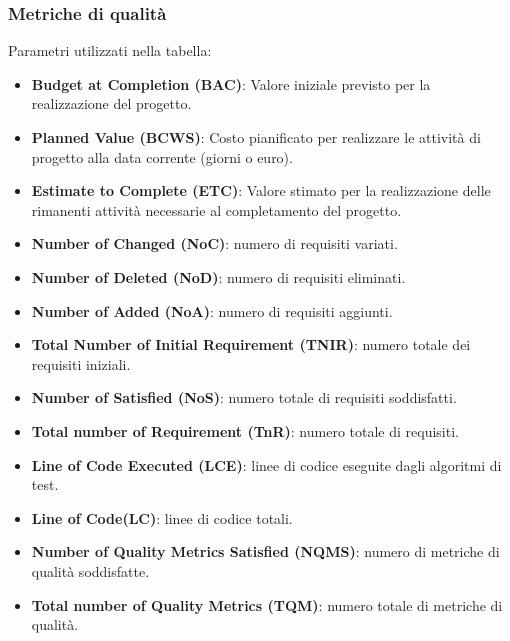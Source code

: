 \subsubsection{Metriche di qualità}
Parametri utilizzati nella tabella:
\begin{itemize}
    \item \textbf{Budget at Completion (BAC)}: Valore iniziale previsto per la realizzazione del progetto.
    \item \textbf{Planned Value (BCWS)}: Costo pianificato per realizzare le attività di progetto alla data corrente (giorni o euro).
    \item \textbf{Estimate to Complete (ETC)}: Valore stimato per la realizzazione delle rimanenti attività necessarie al completamento del progetto.
    \item \textbf{Number of Changed (NoC)}: numero di requisiti variati.
    \item \textbf{Number of Deleted (NoD)}: numero di requisiti eliminati.
    \item \textbf{Number of Added (NoA)}: numero di requisiti aggiunti.
    \item \textbf{Total Number of Initial Requirement (TNIR)}: numero totale dei requisiti iniziali.
    \item \textbf{Number of Satisfied (NoS)}: numero totale di requisiti soddisfatti.
    \item \textbf{Total number of Requirement (TnR)}: numero totale di requisiti.
    \item \textbf{Line of Code Executed (LCE)}: linee di codice eseguite dagli algoritmi di test.
    \item \textbf{Line of Code(LC)}: linee di codice totali.
    \item \textbf{Number of Quality Metrics Satisfied (NQMS)}: numero di metriche di qualità soddisfatte.
    \item \textbf{Total number of Quality Metrics (TQM)}: numero totale di metriche di qualità.
\end{itemize}


